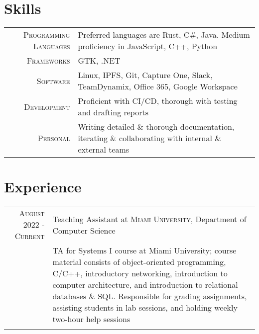 \documentclass[letterpaper,10pt]{article} %
\begin{document}
{\begin{tabular}{rl}

\end{tabular}


\section{Skills}

\footnotesize{\begin{tabular}{rl}
\textsc{Programming Languages} & Preferred languages are Rust, C\#, Java. Medium proficiency in JavaScript, C++, Python\\
\textsc{Frameworks} & GTK, .NET\\
\textsc{Software} & Linux, IPFS, Git, Capture One, Slack, TeamDynamix, Office 365, Google Workspace\\
\textsc{Development} & Proficient with CI/CD, thorough with testing and drafting reports\\
\textsc{Personal} & Writing detailed \& thorough documentation, iterating \& collaborating with internal \& external teams

\end{tabular}\normalsize


\section{Experience}

\begin{tabular}{r|p{11cm}}
\textsc{August 2022 - Current} & Teaching Assistant at \textsc{Miami University}, Department of Computer Science \emph{}\\
& \footnotesize{TA for Systems I course at Miami University; course material consists of object-oriented programming, C/C++, introductory networking, introduction to computer architecture, and introduction to relational databases \& SQL. Responsible for grading assignments, assisting students in lab sessions, and holding weekly two-hour help sessions}\\
\multicolumn{2}{c}{} \\


\end{tabular}}}
\end{document}
